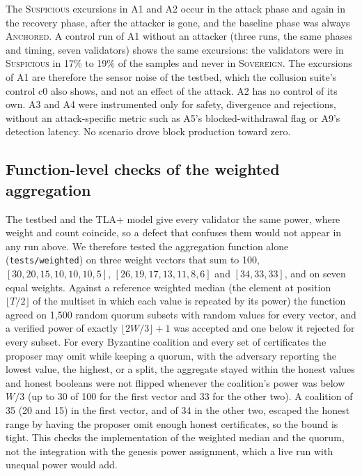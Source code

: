 The \textsc{Suspicious} excursions in A1 and A2 occur in the attack phase and
again in the recovery phase, after the attacker is gone, and the baseline phase
was always \textsc{Anchored}. A control run of A1 without an attacker (three runs, the same phases and timing,
seven validators) shows the same excursions: the validators were in
\textsc{Suspicious} in 17\% to 19\% of the samples and never in \textsc{Sovereign}. The
excursions of A1 are therefore the sensor noise of the testbed, which the collusion
suite's control c0 also shows, and not an effect of the attack. A2 has no control of
its own. A3 and
A4 were instrumented only for safety, divergence and rejections, without an
attack-specific metric such as A5's blocked-withdrawal flag or A9's detection
latency. No scenario drove block production toward zero.

\FloatBarrier

\subsection*{Function-level checks of the weighted aggregation}

The testbed and the TLA+ model give every
validator the same power, where weight and count coincide, so a defect that
confuses them would not appear in any run above. We therefore tested the
aggregation function alone (\texttt{tests/weighted}) on three weight vectors that
sum to 100, $[30,20,15,10,10,10,5]$, $[26,19,17,13,11,8,6]$ and $[34,33,33]$, and
on seven equal weights. Against a reference weighted median (the element at
position $\lfloor T/2\rfloor$ of the multiset in which each value is repeated by
its power) the function agreed on 1{,}500 random quorum subsets with random
values for every vector, and a verified power of exactly $\lfloor 2W/3\rfloor{+}1$
was accepted and one below it rejected for every subset. For every Byzantine
coalition and every set of certificates the proposer may omit while keeping a
quorum, with the adversary reporting the lowest value, the highest, or a split,
the aggregate stayed within the honest values and honest booleans were not
flipped whenever the coalition's power was below $W/3$ (up to 30 of 100 for the
first vector and 33 for the other two). A coalition of 35 (20 and 15) in the first
vector, and of 34 in the other two, escaped the honest range by having the proposer omit
enough honest certificates, so the bound is tight. This checks the
implementation of the weighted median and the quorum, not the integration
with the genesis power assignment, which a live run with unequal power would
add.

